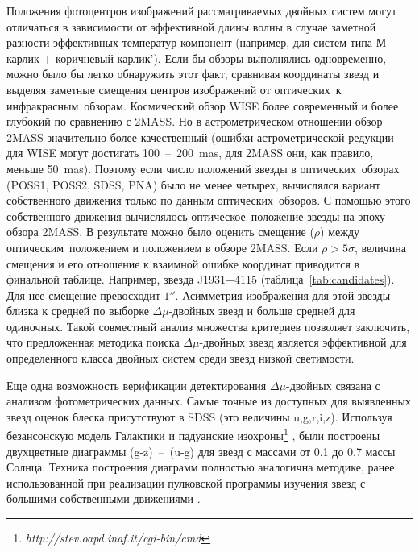 Положения фотоцентров изображений рассматриваемых двойных систем могут отличаться в зависимости от эффективной длины волны в случае заметной разности эффективных температур компонент (например, для систем типа \glqq М--карлик + коричневый карлик'). Если бы обзоры выполнялись одновременно, можно было бы легко обнаружить этот факт, сравнивая координаты звезд и выделяя заметные смещения центров изображений от \glqq оптических\grqq\ к \glqq инфракрасным\grqq\ обзорам. Космический обзор WISE более современный и более глубокий по сравнению с 2MASS. Но в астрометрическом отношении обзор 2MASS значительно более качественный (ошибки астрометрической редукции для WISE могут достигать 100~--~200~mas, для 2MASS они, как правило, меньше 50~mas). Поэтому если число положений звезды в \glqq оптических\grqq\ обзорах (POSS1, POSS2, SDSS, PNA) было не менее четырех, вычислялся вариант собственного движения только по данным \glqq оптических\grqq\ обзоров. С помощью этого собственного движения вычислялось \glqq оптическое\grqq\ положение звезды на эпоху обзора 2MASS. В результате можно было оценить смещение ($\rho$) между \glqq оптическим\grqq\ положением и положением в обзоре 2MASS. Если $\rho>5\sigma$, величина смещения и его отношение к взаимной ошибке координат приводится в финальной таблице. Например, звезда J1931+4115 (таблица~\ref{tab:candidates}). Для нее смещение превосходит $1''$. Асимметрия изображения для этой звезды близка к средней по выборке $\Delta\mu$-двойных звезд и больше средней для \glqq одиночных\grqq . Такой совместный анализ множества критериев позволяет заключить, что предложенная методика поиска $\Delta\mu$-двойных звезд является эффективной для определенного класса двойных систем среди звезд низкой светимости.

Еще одна возможность верификации детектирования $\Delta\mu$-двойных связана с анализом фотометрических данных. Самые точные из доступных для выявленных звезд оценок блеска присутствуют в SDSS (это величины u,g,r,i,z). Используя безансонскую модель Галактики  и падуанские изохроны\footnote{\textit{http://stev.oapd.inaf.it/cgi-bin/cmd}} , были построены двухцветные диаграммы (g-z)~--~(u-g) для звезд с массами от 0.1 до 0.7 массы Солнца. Техника построения диаграмм полностью аналогична методике, ранее использованной при реализации пулковской программы изучения звезд с большими собственными движениями .

